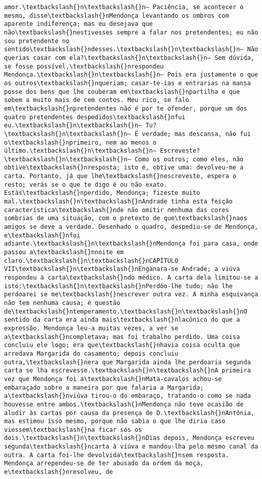 \begin{Verbatim}[commandchars=\\\{\}]
amor.\textbackslash{}n\textbackslash{}n— Paciência, se acontecer o mesmo, disse\textbackslash{}nMendonça levantando os ombros com aparente indiferença; mas eu desejava que não\textbackslash{}nestivesses sempre a falar nos pretendentes; eu não sou pretendente no sentido\textbackslash{}ndesses.\textbackslash{}n\textbackslash{}n— Não querias casar com ela?\textbackslash{}n\textbackslash{}n— Sem dúvida, se fosse possível,\textbackslash{}nrespondeu Mendonça.\textbackslash{}n\textbackslash{}n— Pois era justamente o que os outros\textbackslash{}nqueriam; casar-te-ias e entrarias na mansa posse dos bens que lhe couberam em\textbackslash{}npartilha e que sobem a muito mais de cem contos. Meu rico, se falo em\textbackslash{}npretendentes não é por te ofender, porque um dos quatro pretendentes despedidos\textbackslash{}nfui eu.\textbackslash{}n\textbackslash{}n— Tu?\textbackslash{}n\textbackslash{}n— É verdade; mas descansa, não fui o\textbackslash{}nprimeiro, nem ao menos o último.\textbackslash{}n\textbackslash{}n— Escreveste?\textbackslash{}n\textbackslash{}n— Como os outros; como eles, não obtive\textbackslash{}nresposta; isto é, obtive uma: devolveu-me a carta. Portanto, já que lhe\textbackslash{}nescreveste, espera o resto; verás se o que te digo é ou não exato. Estás\textbackslash{}nperdido, Mendonça; fizeste muito mal.\textbackslash{}n\textbackslash{}nAndrade tinha esta feição característica\textbackslash{}nde não omitir nenhuma das cores sombrias de uma situação, com o pretexto de que\textbackslash{}naos amigos se deve a verdade. Desenhado o quadro, despediu-se de Mendonça, e\textbackslash{}nfoi adiante.\textbackslash{}n\textbackslash{}nMendonça foi para casa, onde passou a\textbackslash{}nnoite em claro.\textbackslash{}n\textbackslash{}nCAPÍTULO VII\textbackslash{}n\textbackslash{}nEnganara-se Andrade; a viúva respondeu à carta\textbackslash{}ndo médico. A carta dela limitou-se a isto:\textbackslash{}n\textbackslash{}nPerdôo-lhe tudo; não lhe perdoarei se me\textbackslash{}nescrever outra vez. A minha esquivança não tem nenhuma causa; é questão de\textbackslash{}ntemperamento.\textbackslash{}n\textbackslash{}nO sentido da carta era ainda mais\textbackslash{}nlacônico do que a expressão. Mendonça leu-a muitas vezes, a ver se a\textbackslash{}ncompletava; mas foi trabalho perdido. Uma coisa concluiu ele logo; era que\textbackslash{}nhavia coisa oculta que arredava Margarida do casamento; depois concluiu outra,\textbackslash{}nera que Margarida ainda lhe perdoaria segunda carta se lha escrevesse.\textbackslash{}n\textbackslash{}nA primeira vez que Mendonça foi a\textbackslash{}nMata-cavalos achou-se embaraçado sobre a maneira por que falaria a Margarida; a\textbackslash{}nviúva tirou-o do embaraço, tratando-o como se nada houvesse entre ambos.\textbackslash{}nMendonça não teve ocasião de aludir às cartas por causa da presença de D.\textbackslash{}nAntônia, mas estimou isso mesmo, porque não sabia o que lhe diria caso viessem\textbackslash{}na ficar sós os dois.\textbackslash{}n\textbackslash{}nDias depois, Mendonça escreveu segunda\textbackslash{}ncarta à viúva e mandou-lha pelo mesmo canal da outra. A carta foi-lhe devolvida\textbackslash{}nsem resposta. Mendonça arrependeu-se de ter abusado da ordem da moça, e\textbackslash{}nresolveu, de 
\end{Verbatim}
